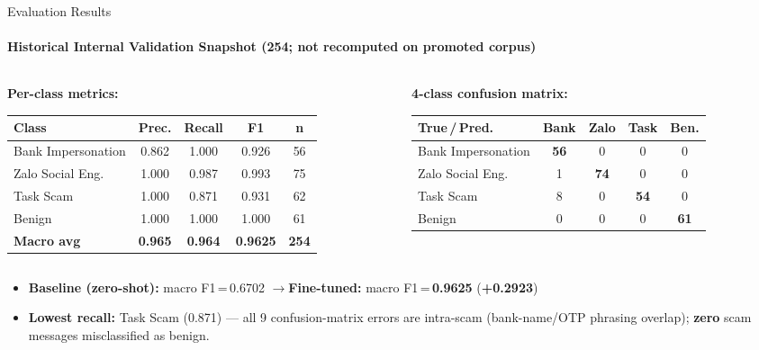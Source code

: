 \begin{frame}{Evaluation Results}
  \framesubtitle{Historical Internal Validation Snapshot (254; not recomputed on promoted corpus)}
  \begin{columns}[T,onlytextwidth]
    \begin{column}{0.54\textwidth}
      {\scriptsize\textbf{Per-class metrics:}}\\[2pt]
      {\scriptsize
      \setlength{\tabcolsep}{3pt}
      \renewcommand{\arraystretch}{1.15}
      \begin{tabular}{lcccc}
        \toprule
        \textbf{Class} & \textbf{Prec.} & \textbf{Recall} & \textbf{F1} & \textbf{n} \\
        \midrule
        Bank Impersonation  & 0.862 & 1.000 & 0.926 & 56  \\
        Zalo Social Eng.    & 1.000 & 0.987 & 0.993 & 75  \\
        Task Scam           & 1.000 & 0.871 & 0.931 & 62  \\
        Benign              & 1.000 & 1.000 & 1.000 & 61  \\
        \midrule
        \textbf{Macro avg}  & \textbf{0.965} & \textbf{0.964} & \textbf{0.9625} & \textbf{254} \\
        \bottomrule
      \end{tabular}}
    \end{column}
    \begin{column}{0.44\textwidth}
      {\scriptsize\textbf{4-class confusion matrix:}}\\[2pt]
      {\scriptsize
      \setlength{\tabcolsep}{2.5pt}
      \renewcommand{\arraystretch}{1.15}
      \begin{tabular}{lcccc}
        \toprule
        \textbf{True\,/\,Pred.} & \textbf{Bank} & \textbf{Zalo} & \textbf{Task} & \textbf{Ben.} \\
        \midrule
        Bank Impersonation & \cellcolor{CVBLUE!15}\textbf{56} & 0 & 0 & 0 \\
        Zalo Social Eng.   & 1 & \cellcolor{CVBLUE!15}\textbf{74} & 0 & 0 \\
        Task Scam          & 8 & 0 & \cellcolor{CVBLUE!15}\textbf{54} & 0 \\
        Benign             & 0 & 0 & 0 & \cellcolor{CVBLUE!15}\textbf{61} \\
        \bottomrule
      \end{tabular}}
    \end{column}
  \end{columns}
  \vspace{0.10cm}
  \begin{itemize}\footnotesize
    \item \textbf{Baseline (zero-shot):} macro F1\,=\,0.6702 \quad$\to$\quad \textbf{Fine-tuned:} macro F1\,=\,\textcolor{CVBLUE}{\textbf{0.9625}} \quad(\textbf{+0.2923})
    \item \textbf{Lowest recall:} Task Scam (0.871) --- all 9 confusion-matrix errors are intra-scam (bank-name/OTP phrasing overlap); \textbf{zero} scam messages misclassified as benign.
  \end{itemize}
\end{frame}
